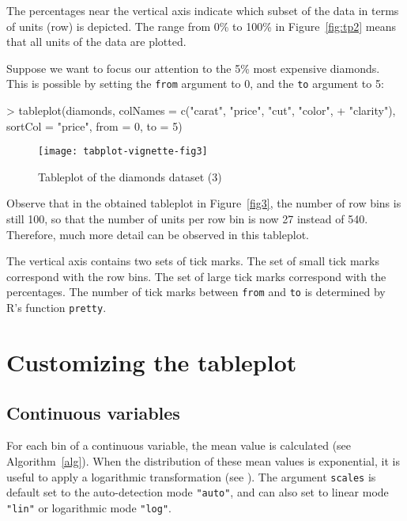\documentclass[11pt, fleqn, a4paper]{article}
\begin{document}
The percentages near the vertical axis indicate which subset of the data in terms of units (row) is depicted. The range from 0\% to 100\% in Figure~\ref{fig:tp2} means that all units of the data are plotted. 

Suppose we want to focus our attention to the 5\% most expensive diamonds. This is possible by setting the {\tt from} argument to 0, and the {\tt to} argument to 5:

\begin{Schunk}
\begin{Sinput}
> tableplot(diamonds, colNames = c("carat", "price", "cut", "color", 
+     "clarity"), sortCol = "price", from = 0, to = 5)
\end{Sinput}
\end{Schunk}

\begin{figure}
\begin{center}
\texttt{[image: tabplot-vignette-fig3]}
\end{center}
\caption{Tableplot of the diamonds dataset (3)}
\label{fig:tp3}
\end{figure}


Observe that in the obtained tableplot in Figure~\ref{fig3}, the number of row bins is still 100, so that the number of units per row bin is now 27 instead of 540. Therefore, much more detail can be observed in this tableplot.

The vertical axis contains two sets of tick marks. The set of small tick marks correspond with the row bins. The set of large tick marks correspond with the percentages. The number of tick marks between {\tt from} and {\tt to} is determined by R's function {\tt pretty}.


\section{Customizing the tableplot}


\subsection{Continuous variables}

For each bin of a continuous variable, the mean value is calculated (see Algorithm~\ref{alg}).
When the distribution of these mean values is exponential, it is useful to apply a logarithmic transformation (see \cite{ten11}). The argument {\tt scales} is default set to the auto-detection mode {\tt "auto"}, and can also set to linear mode {\tt "lin"} or logarithmic mode {\tt "log"}.
\end{document}

